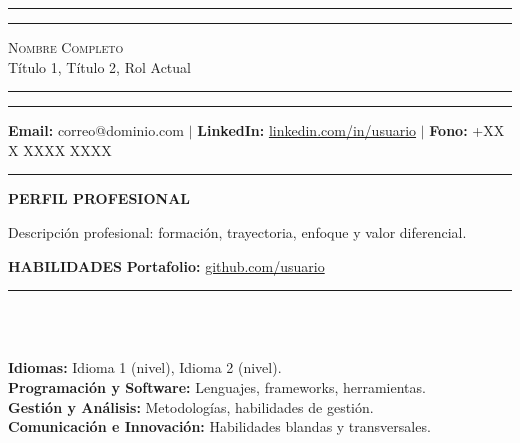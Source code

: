 \documentclass[10pt,a4paper]{article}
\begin{document}
\sloppy
{}

\noindent\rule{\textwidth}{0.5pt}\vspace{-0.25cm}
\noindent\rule{\textwidth}{2pt}\vspace{-0.4cm}
\begin{center}
  \Large{\textsc{Nombre Completo}}\\ \vspace{0.1cm}
  \large{Título 1, Título 2, Rol Actual}\\
\end{center}
\vspace{-0.5cm}\noindent\rule{\textwidth}{0.5pt}\vspace{-0.25cm}
\noindent\rule{\textwidth}{2pt}\vspace{-0.3178cm}

\begin{center}
\textbf{Email:} correo@dominio.com $|$
\textbf{LinkedIn:} \href{https://linkedin.com/in/usuario}{linkedin.com/in/usuario} $|$
\textbf{Fono:} +XX X XXXX XXXX\\

\vspace{-0.3cm}\noindent\rule{\textwidth}{0.5pt}
\textbf{PERFIL PROFESIONAL}\vspace{-0.25cm}
\begin{justify}
Descripción profesional: formación, trayectoria, enfoque y valor diferencial.
\end{justify}
\end{center}

\vspace{-0.10cm}\textbf{HABILIDADES}\hfill
\textbf{Portafolio: }\href{https://github.com/usuario}{github.com/usuario}
\vspace{-0.20cm}
\noindent\rule{\textwidth}{2pt}\phantom{a}
\\ \vspace{-0.9cm} \\
\begin{flushleft}
\textbf{Idiomas:} Idioma 1 (nivel), Idioma 2 (nivel).\\
\textbf{Programación y Software:} Lenguajes, frameworks, herramientas.\\
\textbf{Gestión y Análisis:} Metodologías, habilidades de gestión.\\
\textbf{Comunicación e Innovación:} Habilidades blandas y transversales.
\end{flushleft}\phantom{a}
\\ \vspace{-1cm} \\
\end{document}
